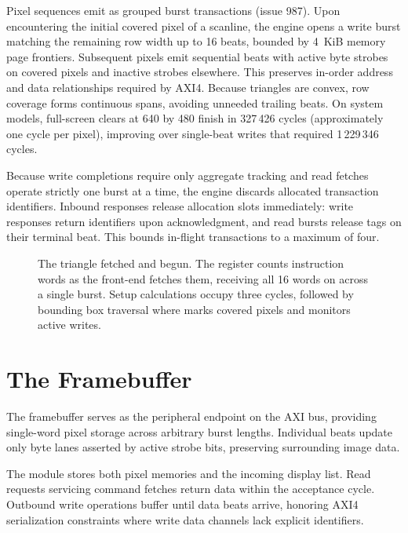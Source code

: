 \documentclass[journal,9pt]{IEEEtran}
\newcommand{\gpupart}[4]{%
}
\begin{document}
Pixel sequences emit as grouped burst transactions (issue 987). Upon
encountering the initial covered pixel of a scanline, the engine opens a
write burst matching the remaining row width up to 16 beats, bounded by
4~KiB memory page frontiers. Subsequent pixels emit sequential beats with
active byte strobes on covered pixels and inactive strobes elsewhere. This
preserves in-order address and data relationships required by AXI4. Because
triangles are convex, row coverage forms continuous spans, avoiding unneeded
trailing beats. On system models, full-screen clears at 640 by 480 finish in
327\,426 cycles (approximately one cycle per pixel), improving over
single-beat writes that required 1\,229\,346 cycles.

Because write completions require only aggregate tracking and read fetches
operate strictly one burst at a time, the engine discards allocated
transaction identifiers. Inbound responses release allocation slots
immediately: write responses return identifiers upon acknowledgment, and
read bursts release tags on their terminal beat. This bounds in-flight
transactions to a maximum of four.

\begin{figure}[t]
\centering

\caption{The triangle fetched and begun. The  register counts
instruction words as the front-end fetches them, receiving all 16 words on
 across a single burst. Setup calculations occupy three cycles,
followed by bounding box traversal where  marks covered pixels and
 monitors active writes.}
\label{fig:g-wave}
\end{figure}

\section{The Framebuffer}
\label{sec:g-fb}

The framebuffer serves as the peripheral endpoint on the AXI bus, providing
single-word pixel storage across arbitrary burst lengths. Individual beats
update only byte lanes asserted by active strobe bits, preserving surrounding
image data.

\gpupart{fb.rs}{run}{The framebuffer implementation.}{lst:g-fb}

The module stores both pixel memories and the incoming display list. Read
requests servicing command fetches return data within the acceptance cycle.
Outbound write operations buffer until data beats arrive, honoring AXI4
serialization constraints where write data channels lack explicit
identifiers.
\end{document}
